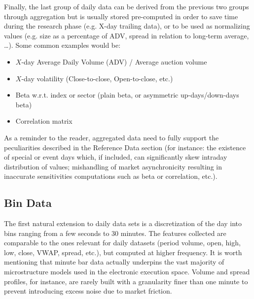 Finally, the last group of daily data can be derived from the previous two groups through aggregation but is usually stored pre-computed in order to save time during the research phase (e.g. X-day trailing data), or to be used as normalizing values (e.g. size as a percentage of ADV, spread in relation to long-term average, \dots). Some common examples would be:
        \begin{itemize}
        \item $X$-day Average Daily Volume (ADV) / Average auction volume
        \item $X$-day volatility (Close-to-close, Open-to-close, etc.)
        \item Beta w.r.t. index or sector (plain beta, or asymmetric up-days/down-days beta)
        \item Correlation matrix
        \end{itemize}
As a reminder to the reader, aggregated data need to fully support the peculiarities described in the Reference Data section (for instance: the existence of special or event days which, if included, can significantly skew intraday distribution of values; mishandling of market asynchronicity resulting in inaccurate sensitivities computations such as beta or correlation, etc.). \\

\subsection{Bin Data} 
The first natural extension to daily data sets is a discretization of the day into bins ranging from a few seconds to 30 minutes. The features collected are comparable to the ones relevant for daily datasets (period volume, open, high, low, close, VWAP, spread, etc.), but computed at higher frequency. It is worth mentioning that minute bar data actually underpins the vast majority of microstructure models used in the electronic execution space. Volume and spread profiles, for instance, are rarely built with a granularity finer than one minute to prevent introducing excess noise due to market friction.

